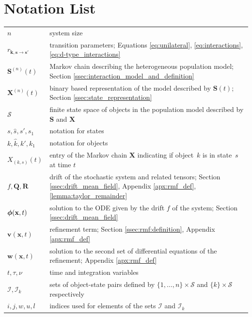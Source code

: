 \documentclass[acmsmall]{acmart}
\newcommand\bs{\mathbf{s}}
\newcommand\bk{\mathbf{k}}
\newcommand\bx{\mathbf{x}}
\newcommand\bS{\mathbf{S}}
\newcommand\bX{\mathbf{X}}
\newcommand\bR{\mathbf{R}}
\newcommand\bv{\mathbf{v}}
\newcommand\bw{\mathbf{w}}
\newcommand\bdrift{f}
\newcommand\bphi{\text{\boldmath$\phi$}}
\newcommand\bQ{\mathbf{Q}}
\newcommand\calI{\mathcal{I}}
\newcommand\calS{\mathcal{S}}
\newcommand\toN{^{(n)}}
\begin{document}
\section{Notation List}
\label{apx:notations}

\begin{center}
\begin{tabular}{l l}
$n$ & system size\\
$r_{\bk, \bs \rightarrow \bs'}$ & transition parameters; Equations \eqref{eq:unilateral}, \eqref{eq:interactions}, \eqref{eq:d-type_interactions} \\
$\bS\toN(t)$ & Markov chain describing the heterogeneous population model; Section \ref{ssec:interaction_model_and_definition} \\
$\bX\toN(t)$ & binary based representation of the model described by $\bS(t)$; Section \ref{ssec:state_representation} \\
$\calS $ & finite state space of objects in the population model described by $\bS$ and $\bX$ \\
$s, \hat{s}, s', s_1$ & notation for states \\
$k, \hat{k}, k', k_1$ & notation for objects \\
$X_{(k,s)}(t)$ & entry of the Markov chain $\bX$ indicating if object~$k$ is in state~$s$ at time $t$ \\
$\bdrift, \bQ, \bR $ &  drift of the stochastic system and related tensors; Section \ref{ssec:drift_mean_field}, Appendix \ref{apx:rmf_def}, \ref{lemma:taylor_remainder} \\
$\bphi(\bx, t)$ & solution to the ODE given by the drift $\bdrift$ of the system; Section \ref{ssec:drift_mean_field} \\
$\bv(\bx, t)$ & refinement term; Section \ref{ssec:rmf:definition}, Appendix \ref{apx:rmf_def}\\
$\bw(\bx, t)$ & solution to the second set of differential equations of the refinement; Appendix \ref{apx:rmf_def} \\
$t, \tau, \nu$ & time and integration variables \\ 
$\calI, \calI_k$ & sets of object-state pairs defined by $\{1,\ldots,n\}\times \calS$ and $\{k\}\times \calS$ respectively\\
$ i,j,w,u,l $ & indices used for elements of the sets $\calI$ and $\calI_k$ \\

\end{tabular}
\end{center}
\end{document}
